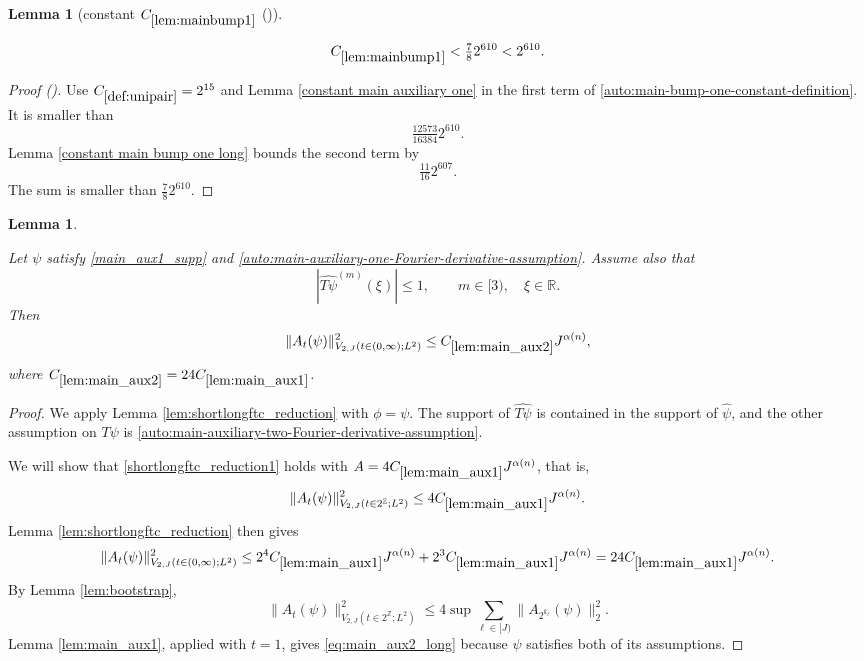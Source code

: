 \documentclass[12pt,reqno]{amsart}
\newcommand{\auto}{{({\tiny\faCar})}}
\theoremstyle{plain}
\newtheorem{lemma}[theorem]{Lemma}
\numberwithin{equation}{section}
\theoremstyle{remark}
\newcommand{\uses}[1]{}
\newcommand{\usesdefs}[1]{}
\newcommand{\leanok}{}
\newcommand{\lean}[1]{}
\newcommand{\Z}{{\mathbb Z}}
\newcommand{\R}{{\mathbb R}}
\begin{document}
\begin{lemma}[constant $C_{\ref{lem:mainbump1}}$ \auto]\label{constant main bump one}\uses{constant main auxiliary one,lem:mainbump1,constant main bump one long}\usesdefs{def:unipair}
\lean{Auto.constantMainBumpOne}
\leanok
\begin{equation}\label{constant main bump one bound}
C_{\ref{lem:mainbump1}}<\tfrac78 2^{610}<2^{610}.
\end{equation}
\end{lemma}
\begin{proof}[Proof \auto]
Use $C_{\ref{def:unipair}}=2^{15}$ and Lemma \ref{constant main auxiliary one} in the first term of \eqref{auto:main-bump-one-constant-definition}. It is smaller than
\[
\tfrac{12573}{16384}2^{610}.
\]
Lemma \ref{constant main bump one long} bounds the second term by
\[
\tfrac{11}{16}2^{607}.
\]
The sum is smaller than $\frac78 2^{610}$.
\end{proof}

\begin{lemma}\label{lem:main_aux2}\uses{lem:shortlongftc_reduction,lem:main_aux1,lem:bootstrap}\usesdefs{A_def}
\lean{Auto.mainAuxTwo}
\leanok
Let $\psi$ satisfy \eqref{main_aux1_supp} and \eqref{auto:main-auxiliary-one-Fourier-derivative-assumption}. Assume also that
\begin{equation}\label{auto:main-auxiliary-two-Fourier-derivative-assumption}
|\widehat{T\psi}^{(m)}(\xi)|\le1,
\qquad
m\in[3),
\quad
\xi\in\R.
\end{equation}
Then
\begin{equation}\label{main_aux2}
\|A_t(\psi)\|_{V_{2,J}(t\in(0,\infty);L^2)}^2
\le C_{\ref{lem:main_aux2}}J^{\alpha(n)},
\end{equation}
where $C_{\ref{lem:main_aux2}}=24C_{\ref{lem:main_aux1}}$.
\end{lemma}

\begin{proof}
We apply Lemma \ref{lem:shortlongftc_reduction} with $\phi=\psi$. The support of $\widehat{T\psi}$ is contained in the support of $\widehat\psi$, and the other assumption on $T\psi$ is \eqref{auto:main-auxiliary-two-Fourier-derivative-assumption}.

We will show that \eqref{shortlongftc_reduction1} holds with $A=4C_{\ref{lem:main_aux1}}J^{\alpha(n)}$, that is,
\begin{equation}\label{eq:main_aux2_long}
\|A_t(\psi)\|^2_{V_{2,J}(t\in2^\Z;L^2)}
\le4C_{\ref{lem:main_aux1}}J^{\alpha(n)}.
\end{equation}
Lemma \ref{lem:shortlongftc_reduction} then gives
\[
\|A_t(\psi)\|_{V_{2,J}(t\in(0,\infty);L^2)}^2
\le2^4C_{\ref{lem:main_aux1}}J^{\alpha(n)}
+2^3C_{\ref{lem:main_aux1}}J^{\alpha(n)}
=24C_{\ref{lem:main_aux1}}J^{\alpha(n)}.
\]
By Lemma \ref{lem:bootstrap},
\[
\|A_t(\psi)\|^2_{V_{2,J}(t\in2^\Z;L^2)}
\le4\sup\sum_{\ell\in[J)}\|A_{2^{k_\ell}}(\psi)\|_2^2.
\]
Lemma \ref{lem:main_aux1}, applied with $t=1$, gives \eqref{eq:main_aux2_long} because $\psi$ satisfies both of its assumptions.
\end{proof}
\end{document}
